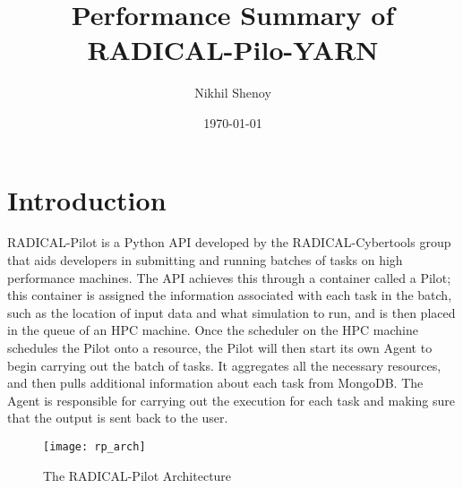 \documentclass[]{article}
\begin{document}
\title{Performance Summary of RADICAL-Pilo-YARN}
\author{Nikhil Shenoy}
\date{\today}
\maketitle


\section{Introduction}
	RADICAL-Pilot is a Python API developed by the RADICAL-Cybertools group that aids developers in submitting and running batches of tasks on high performance machines. The API achieves this through a container called a Pilot; this container is assigned the information associated with each task in the batch, such as the location of input data and what simulation to run, and is then placed in the queue of an HPC machine. Once the scheduler on the HPC machine schedules the Pilot onto a resource, the Pilot will then start its own Agent to begin carrying out the batch of tasks. It aggregates all the necessary resources, and then pulls additional information about each task from MongoDB. The Agent is responsible for carrying out the execution for each task and making sure that the output is sent back to the user.

	\begin{figure}[H]
		\centering
		\texttt{[image: rp\_arch]}
		\caption{The RADICAL-Pilot Architecture \cite{rp_arch}}
		\label{fig:pipeline_block_diagram}
	\end{figure}
\end{document}
